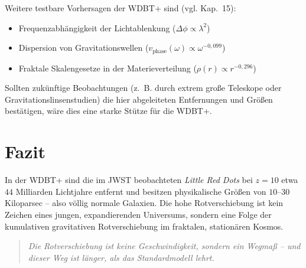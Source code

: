 \documentclass[12pt,a4paper]{article}
\begin{document}
Weitere testbare Vorhersagen der WDBT+ sind (vgl. Kap.~15):
\begin{itemize}
\item Frequenzabhängigkeit der Lichtablenkung ($\Delta\phi \propto \lambda^2$)
\item Dispersion von Gravitationswellen ($v_{\text{phase}}(\omega) \propto \omega^{-0,099}$)
\item Fraktale Skalengesetze in der Materieverteilung ($\rho(r) \propto r^{-0,296}$)
\end{itemize}

Sollten zukünftige Beobachtungen (z.~B. durch extrem große Teleskope oder Gravitationslinsenstudien) die hier abgeleiteten Entfernungen und Größen bestätigen, wäre dies eine starke Stütze für die WDBT+.

\section{Fazit}

In der WDBT+ sind die im JWST beobachteten \textit{Little Red Dots} bei $z=10$ etwa $44$ Milliarden Lichtjahre entfernt und besitzen physikalische Größen von $10$--$30$ Kiloparsec – also völlig normale Galaxien. Die hohe Rotverschiebung ist kein Zeichen eines jungen, expandierenden Universums, sondern eine Folge der kumulativen gravitativen Rotverschiebung im fraktalen, stationären Kosmos.

\begin{quote}
\emph{Die Rotverschiebung ist keine Geschwindigkeit, sondern ein Wegmaß – und dieser Weg ist länger, als das Standardmodell lehrt.}
\end{quote}
\end{document}
